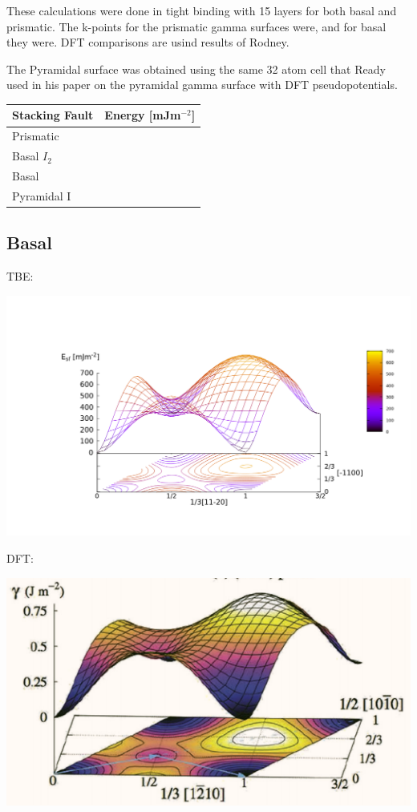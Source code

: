 \documentclass[11pt]{article}
\begin{document}
These calculations were done in tight binding with 15 layers for both
basal and prismatic. The k-points for the prismatic gamma surfaces were, and for basal they were. 
DFT comparisons are usind results of Rodney. 

The Pyramidal surface was obtained using the same 32 atom cell that
Ready used in his paper on the pyramidal gamma surface with DFT
pseudopotentials. 

\begin{center}
\begin{tabular}{ll}
Stacking Fault & Energy [mJm\(^{-2}\)]\\
\hline
Prismatic & \\
Basal \(I_2\) & \\
Basal & \\
Pyramidal I & \\
\end{tabular}
\end{center}

\newpage
\subsection{Basal}
\label{sec:org20f7aa0}

TBE:
\begin{center}
\includegraphics[width=.9\linewidth]{Images/basal_gamma_surface_final_model_2020-01-15.png}
\end{center}


DFT:
\begin{center}
\includegraphics[width=.9\linewidth]{Images/rodney_basal_ti_gamma_surface.png}
\end{center}
\end{document}

